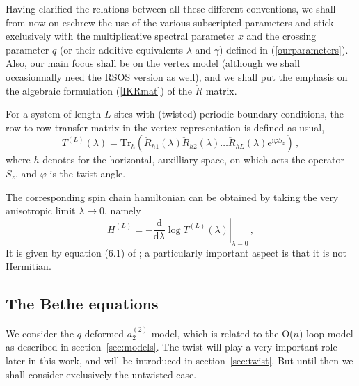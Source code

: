 \documentclass[11pt]{article}
\begin{document}
Having clarified the relations between all these different conventions, we shall from now on eschrew the use of the various subscripted parameters and stick exclusively with the multiplicative spectral parameter $x$ and the crossing parameter $q$ (or their additive equivalents $\lambda$ and $\gamma$) defined in (\ref{ourparameters}).
Also, our main focus shall be on the vertex model (although we shall occasionnally need the RSOS version as well), and we shall put the emphasis on the algebraic formulation (\ref{IKRmat}) of the $\check{R}$ matrix.


For a system of length $L$ sites with (twisted) periodic boundary conditions, the row to row transfer matrix in the vertex representation is defined as usual, 
\begin{equation}
 T^{(L)}(\lambda) = \mathrm{Tr}_h \left(\check{R}_{h1}(\lambda)\check{R}_{h2}(\lambda)\ldots \check{R}_{hL}(\lambda) \mathrm{e}^{\mathrm{i} \varphi S_z} \right) \,,
 \label{eq:Tmatrix}
 \end{equation}
 where $h$ denotes for the horizontal, auxilliary space, on which acts the operator $S_z$, and $\varphi$ is the twist angle. 

The corresponding spin chain hamiltonian can be obtained by taking the very anisotropic limit $\lambda \to 0$, namely 
\begin{equation}
 H^{(L)} = -\left.\frac{\mathrm{d}}{\mathrm{d}\lambda}\log T^{(L)}(\lambda) \right|_{\lambda=0} \,,
\end{equation}
It is given by equation (6.1) of \cite{Nienhuis}; a  particularly important aspect is that it is not Hermitian.


 
\subsection{The Bethe equations}


We consider the $q$-deformed $a_2^{(2)}$ model, which is related to the O($n$) loop model as described in section~\ref{sec:models}.
The twist will play a very important role later in this work, and will be introduced in section~\ref{sec:twist}. But until then we shall consider
exclusively the untwisted case.
\end{document}
